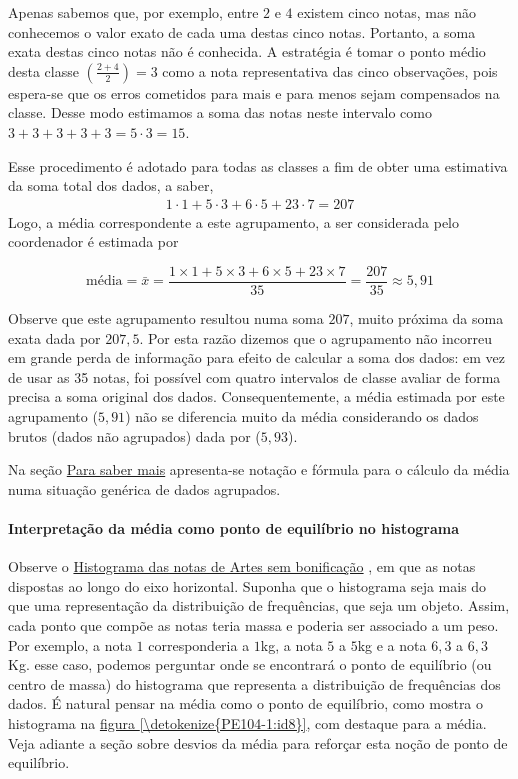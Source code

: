 Apenas sabemos que, por exemplo, entre $2$ e $4$ existem cinco notas, mas não conhecemos o valor exato de cada uma destas cinco notas. Portanto, a soma exata destas cinco notas não é conhecida. A estratégia é tomar o ponto médio desta classe \(\left (\frac{2+4}{2}\right )=3\) como a nota representativa das cinco observações, pois espera-se que os erros cometidos para mais e para menos sejam compensados na classe. Desse modo estimamos a soma das notas neste intervalo como \(3+3+3+3+3=5\cdot 3=15\).

Esse procedimento é adotado para todas as classes a fim de obter uma estimativa da soma total dos dados, a saber,
\begin{equation*}
\begin{split}1\cdot 1+5\cdot 3+6\cdot 5+23\cdot 7=207\end{split}
\end{equation*}
Logo, a média correspondente a este agrupamento, a ser considerada pelo coordenador é estimada por

\begin{equation*}
\text{média}=\bar{x}=\frac{1\times 1+5\times 3+6\times 5+23\times 7}{35}=\frac{207}{35}\approx 5,91
\end{equation*}

Observe que este agrupamento resultou numa soma $207$, muito próxima da soma exata dada por $207,5$. Por esta razão dizemos que o agrupamento não incorreu em grande perda de informação para efeito de calcular a soma dos dados: em vez de usar as 35 notas, foi possível com quatro intervalos de classe avaliar de forma precisa a soma original dos dados. Consequentemente, a média estimada por este agrupamento ($5{,}91$) não se diferencia muito da média considerando os dados brutos (dados não agrupados) dada por ($5{,}93$).

Na seção \hyperref[\detokenize{PE104-A:sec-para-saber-mais}]{Para saber mais} apresenta-se notação e fórmula para o cálculo da média numa situação genérica de dados agrupados.

\paragraph{Interpretação da média como ponto de equilíbrio no histograma}

Observe o \hyperref[\detokenize{PE104-0:fig-histograma-notas-sem-bonificacao}]{Histograma das notas de Artes sem bonificação} , em que as notas dispostas ao longo do eixo horizontal. Suponha que o histograma seja mais do que uma representação da distribuição de frequências, que seja um objeto. Assim, cada ponto que compõe as notas teria massa e poderia ser associado a um peso. Por exemplo, a nota $1$ corresponderia a $1$kg, a nota $5$ a $5$kg e a nota $6{,}3$ a $6{,}3$ Kg. esse caso, podemos perguntar onde se encontrará o ponto de equilíbrio (ou centro de massa) do histograma que representa a distribuição de frequências dos dados. É natural pensar na média como o ponto de equilíbrio, como mostra o histograma na \hyperref[\detokenize{PE104-1:id8}]{figura \ref{\detokenize{PE104-1:id8}}}, com destaque para a média. Veja adiante a seção sobre desvios da média para reforçar esta noção de ponto de equilíbrio.


